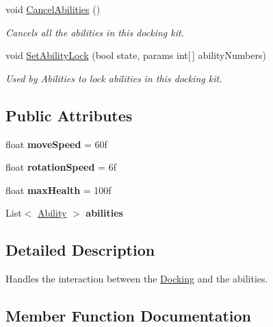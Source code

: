 \begin{DoxyCompactItemize}
void \hyperlink{class_docking_kit_a1eb12e2d59fce858a1cd5bc72b89ce11}{Cancel\+Abilities} ()
\begin{DoxyCompactList}\small\item\em Cancels all the abilities in this docking kit. \end{DoxyCompactList}\item 
void \hyperlink{class_docking_kit_a139a8cf5ba76e6a2237ddce824459d0c}{Set\+Ability\+Lock} (bool state, params int\mbox{[}$\,$\mbox{]} ability\+Numbers)
\begin{DoxyCompactList}\small\item\em Used by Abilities to lock abilities in this docking kit. \end{DoxyCompactList}\end{DoxyCompactItemize}
\subsection*{Public Attributes}
\begin{DoxyCompactItemize}
\item 
\hypertarget{class_docking_kit_a57f83bb5493e4599b257916f9014655f}{}\label{class_docking_kit_a57f83bb5493e4599b257916f9014655f} 
float {\bfseries move\+Speed} = 60f
\item 
\hypertarget{class_docking_kit_a2dd32a4d393d3be9e8df692e170ce895}{}\label{class_docking_kit_a2dd32a4d393d3be9e8df692e170ce895} 
float {\bfseries rotation\+Speed} = 6f
\item 
\hypertarget{class_docking_kit_a547f22eff8e00d7da8fb9e2805d2ee2a}{}\label{class_docking_kit_a547f22eff8e00d7da8fb9e2805d2ee2a} 
float {\bfseries max\+Health} = 100f
\item 
\hypertarget{class_docking_kit_af1f2489e4400f757d90058ef706f738e}{}\label{class_docking_kit_af1f2489e4400f757d90058ef706f738e} 
List$<$ \hyperlink{class_ability}{Ability} $>$ {\bfseries abilities}
\end{DoxyCompactItemize}


\subsection{Detailed Description}
Handles the interaction between the \hyperlink{class_docking}{Docking} and the abilities. 



\subsection{Member Function Documentation}
\hypertarget{class_docking_kit_a1eb12e2d59fce858a1cd5bc72b89ce11}{}\label{class_docking_kit_a1eb12e2d59fce858a1cd5bc72b89ce11} 

